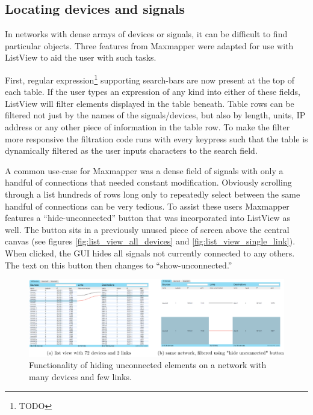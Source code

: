 
	\subsection{Locating devices and signals} %
	\label{sub:locating_devices_and_signals}

In networks with dense arrays of devices or signals, it can be difficult to find particular objects. Three features from Maxmapper were adapted for use with ListView to aid the user with such tasks.

First, regular expression\footnote{TODO} supporting search-bars are now present at the top of each table. If the user types an expression of any kind into either of these fields, ListView will filter elements displayed in the table beneath. Table rows can be filtered not just by the names of the signals/devices, but also by length, units, IP address or any other piece of information in the table row. To make the filter more responsive the filtration code runs with every keypress such that the table is dynamically filtered as the user inputs characters to the search field. 

A common use-case for Maxmapper was a dense field of signals with only a handful of connections that needed constant modification. Obviously scrolling through a list hundreds of rows long only to repeatedly select between the same handful of connections can be very tedious. To assist these users Maxmapper features a ``hide-unconnected'' button that was incorporated into ListView as well. The button sits in a previously unused piece of screen above the central canvas (see figures \ref{fig:list_view_all_devices} and \ref{fig:list_view_single_link}). When clicked, the GUI hides all signals not currently connected to any others. The text on this button then changes to ``show-unconnected.''

\begin{figure}
	\centering
	\includegraphics[width=1\textwidth]{figures/hide_unconnected}
\caption{Functionality of hiding unconnected elements on a network with many devices and few links.}
\label{fig:hide_unconnected}
\end{figure}

